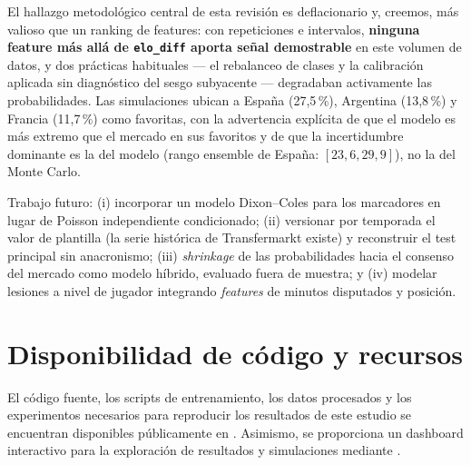 \documentclass[conference]{IEEEtran}
\begin{document}
El hallazgo metodol\'ogico central de esta revisi\'on es deflacionario y,
creemos, m\'as valioso que un ranking de features: con repeticiones e
intervalos, \textbf{ninguna feature m\'as all\'a de \texttt{elo\_diff}
aporta se\~nal demostrable} en este volumen de datos, y dos pr\'acticas
habituales --- el rebalanceo de clases y la calibraci\'on aplicada sin
diagn\'ostico del sesgo subyacente --- degradaban activamente las
probabilidades. Las simulaciones ubican a Espa\~na (27{,}5\,\%),
Argentina (13{,}8\,\%) y Francia (11{,}7\,\%) como favoritas, con la
advertencia expl\'icita de que el modelo es m\'as extremo que el mercado
en sus favoritos y de que la incertidumbre dominante es la del modelo
(rango ensemble de Espa\~na: $[23{,}6, 29{,}9]$), no la del Monte Carlo.

Trabajo futuro: (i) incorporar un modelo Dixon--Coles \cite{dixon1997}
para los marcadores en lugar de Poisson independiente condicionado;
(ii) versionar por temporada el valor de plantilla (la serie hist\'orica
de Transfermarkt existe) y reconstruir el test principal sin anacronismo;
(iii) \emph{shrinkage} de las probabilidades hacia el consenso del
mercado como modelo h\'ibrido, evaluado fuera de muestra; y (iv) modelar
lesiones a nivel de jugador integrando \emph{features} de minutos
disputados y posici\'on.

\section*{Disponibilidad de código y recursos}

El código fuente, los scripts de entrenamiento, los datos procesados y los
experimentos necesarios para reproducir los resultados de este estudio se
encuentran disponibles públicamente en \cite{repo}. Asimismo, se proporciona un
dashboard interactivo para la exploración de resultados y simulaciones
mediante \cite{dashboard}.
\end{document}
